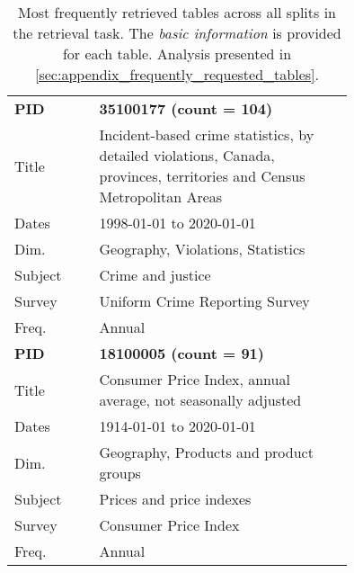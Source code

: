\documentclass[11pt]{article}
\begin{document}
\begin{table}[h]
\begin{tabular}{l p{0.75\linewidth}}
\midrule
\textbf{PID} & \textbf{35100177 (count = 104)} \\
Title &  Incident-based crime statistics, by detailed violations, Canada, provinces, territories and Census Metropolitan Areas \\
Dates &  1998-01-01 to 2020-01-01 \\
Dim. &  Geography, Violations, Statistics \\
Subject &  Crime and justice \\
Survey &  Uniform Crime Reporting Survey \\
Freq. &  Annual \\

\midrule
\textbf{PID} & \textbf{18100005 (count = 91)} \\
Title &  Consumer Price Index, annual average, not seasonally adjusted \\
Dates &  1914-01-01 to 2020-01-01 \\
Dim. &  Geography, Products and product groups \\
Subject &  Prices and price indexes \\
Survey &  Consumer Price Index \\
Freq. &  Annual \\

\bottomrule


\end{tabular}
    \caption{Most frequently retrieved tables across all splits in the retrieval task. The \textit{basic information} is provided for each table. Analysis presented in \autoref{sec:appendix_frequently_requested_tables}.}
    \label{tab:most_popular_tables}
\end{table}
\end{document}
